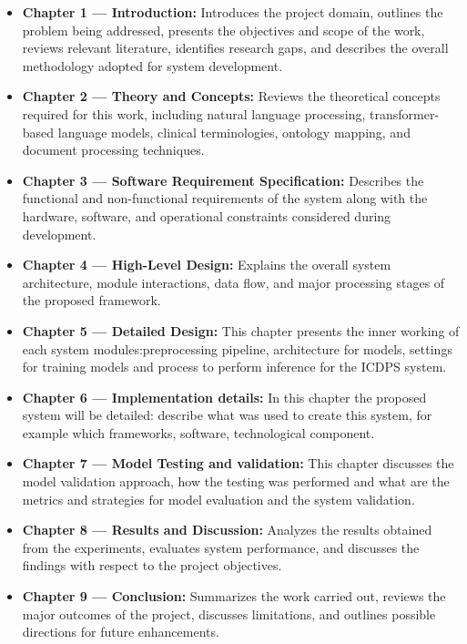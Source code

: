 \begin{itemize}

\item \textbf{Chapter 1 --- Introduction:} Introduces the project domain, outlines the problem being addressed, presents the objectives and scope of the work, reviews relevant literature, identifies research gaps, and describes the overall methodology adopted for system development.

\item \textbf{Chapter 2 --- Theory and Concepts:} Reviews the theoretical concepts required for this work, including natural language processing, transformer-based language models, clinical terminologies, ontology mapping, and document processing techniques.

\item \textbf{Chapter 3 --- Software Requirement Specification:} Describes the functional and non-functional requirements of the system along with the hardware, software, and operational constraints considered during development.

\item \textbf{Chapter 4 --- High-Level Design:} Explains the overall system architecture, module interactions, data flow, and major processing stages of the proposed framework.

\item \textbf{Chapter 5 --- Detailed Design:} This chapter presents the inner working of each system modules:preprocessing pipeline, architecture for models, settings for training models and process to perform inference for the ICDPS system.

\item \textbf{Chapter 6 --- Implementation details:} In this chapter the proposed system will be detailed: describe what was used to create this system, for example which frameworks, software, technological component.

\item \textbf{Chapter 7 --- Model Testing and validation:} This chapter discusses the model validation approach, how the testing was performed and what are the metrics and strategies for model evaluation and the system validation.

\item \textbf{Chapter 8 --- Results and Discussion:} Analyzes the results obtained from the experiments, evaluates system performance, and discusses the findings with respect to the project objectives.

\item \textbf{Chapter 9 --- Conclusion:} Summarizes the work carried out, reviews the major outcomes of the project, discusses limitations, and outlines possible directions for future enhancements.

\end{itemize}

